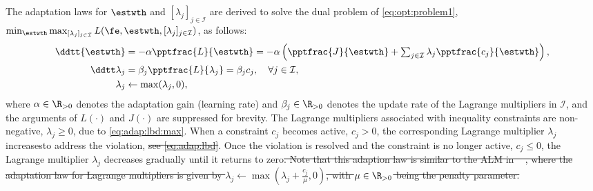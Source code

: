 \documentclass[letterpaper, journal]{IEEEtran}
\newcommand{\ctxt}[2]{\color{#1}#2\color{black}}
\providecommand{\DIFadd}[1]{{\protect\color{blue}\uwave{#1}}} %
\providecommand{\DIFdel}[1]{{\protect\color{red}\sout{#1}}} %
\providecommand{\DIFaddbegin}{} %
\providecommand{\DIFaddend}{} %
\providecommand{\DIFdelbegin}{} %
\providecommand{\DIFdelend}{} %
\begin{document}
The adaptation laws for $\estwth$ and $[\lambda_j]_{j\in\mathcal I}$ are derived to solve the dual problem of \eqref{eq:opt:problem1}, \ie $\min_{\estwth} \max_{[\lambda_j]_{j\in\mathcal I}}L(\fe,\estwth,[\lambda_j]_{j\in\mathcal I})$, as follows:
\begin{subequations}
    \begin{align}
            \ddtt{\estwth}
            &
            =
            -\alpha \pptfrac{L}{\estwth}
            =
            -\alpha 
            \left(
                \pptfrac{J}{\estwth}
                +
                \textstyle\sum_{j\in\mathcal{I}}
                \lambda_j 
                \pptfrac{c_j}{\estwth}
            \right),
        \label{eq:adap:th}
            \\
            \ddtt\lambda_j
            & 
            = 
            \beta_j\pptfrac{L}{\lambda_j} 
            = 
            \beta_j c_j ,
            \quad \forall j\in\mathcal I,
        \label{eq:adap:lbd}
            \\
            \lambda_j & \leftarrow \max(\lambda_j,0) ,
        \label{eq:adap:lbd:max}
    \end{align}
    \label{eq:adaptation law}%
\end{subequations}
where $\alpha\in\R_{>0}$ denotes the adaptation gain (learning rate) and $\beta_j\in\R_{>0}$ denotes the update rate of the Lagrange multipliers in $\mathcal I$, and the arguments of $L(\cdot)$ and $J(\cdot)$ are suppressed for brevity. 
The Lagrange multipliers associated with inequality constraints are non-negative, \ie $\lambda_j\ge 0$, due to \eqref{eq:adap:lbd:max}. 
When a constraint $c_j$ becomes active, \ie $c_j > 0$, the corresponding Lagrange multiplier $\lambda_j$ increases\DIFaddbegin \DIFadd{, see \eqref{eq:adap:lbd}, }\DIFaddend to address the violation, \DIFdelbegin %
\DIFdel{see \eqref{eq:adap:lbd}}\DIFdelend \DIFaddbegin \DIFadd{see \eqref{eq:adap:th}}\DIFaddend .
Once the violation is resolved and the constraint is no longer active, \ie $c_j \le 0$, the Lagrange multiplier $\lambda_j$ decreases gradually until it returns to zero\DIFdelbegin \DIFdel{.
Note that this adaption law is similar to the ALM in \mbox{%
\cite{Nocedal:2006aa}}\hskip0pt%
, where the adaptation law for Lagrange multipliers is given by $\lambda_j\leftarrow \max\left(\lambda_j+\tfrac{c_j}{\mu},0\right)$, with $\mu\in\R_{>0}$ being the penalty parameter.
}\DIFdelend \DIFaddbegin \DIFadd{, see \eqref{eq:adap:lbd:max}.
}\DIFaddend 
\end{document}
